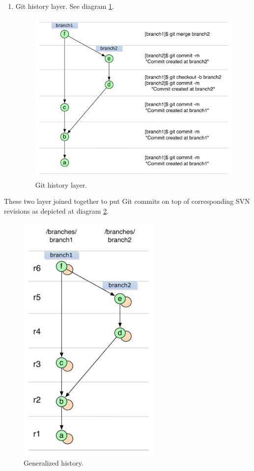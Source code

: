 \begin{enumerate}
	\newpage
	\item Git history layer. See diagram \ref{git_layer}.
	\begin{figure}[!h]
	\label{git_layer}
	\centering
	\includegraphics[width=\linewidth]{img/legend/git_layer.pdf}
	\caption{Git history layer.}
	\end{figure}
\end{enumerate}

\newpage
These two layer joined together to put Git commits on top of corresponding SVN revisions as depicted at diagram \ref{both_layers}.
\begin{figure}[!h]
\centering
\includegraphics[width=7.0cm]{img/legend/generalized_history.pdf}
\caption{Generalized history.}
\label{both_layers}
\end{figure}